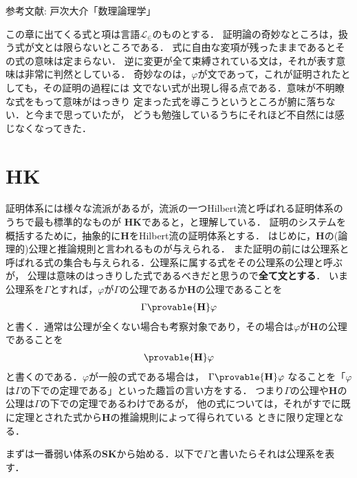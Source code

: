 	\begin{flushleft}
		参考文献: 戸次大介「数理論理学」
	\end{flushleft}
	
	この章に出てくる式と項は言語$\mathcal{L}_{\in}$のものとする．
	証明論の奇妙なところは，扱う式が文とは限らないところである．
	式に自由な変項が残ったままであるとその式の意味は定まらない．
	逆に変更が全て束縛されている文は，それが表す意味は非常に判然としている．
	奇妙なのは，$\varphi$が文であって，これが証明されたとしても，その証明の過程には
	文でない式が出現し得る点である．意味が不明瞭な式をもって意味がはっきり
	定まった式を導こうというところが腑に落ちない．と今まで思っていたが，
	どうも勉強しているうちにそれほど不自然には感じなくなってきた．
	

\section{{\bf HK}}
	証明体系には様々な流派があるが，流派の一つHilbert流と呼ばれる証明体系のうちで最も標準的なものが
	{\bf HK}であると，と理解している．
	証明のシステムを概括するために，抽象的に{\bf H}をHilbert流の証明体系とする．
	はじめに，{\bf H}の(論理的)公理と推論規則と言われるものが与えられる．
	また証明の前には公理系と呼ばれる式の集合も与えられる．公理系に属する式をその公理系の公理と呼ぶが，
	公理は意味のはっきりした式であるべきだと思うので{\bf 全て文とする}．
	いま公理系を$\Gamma$とすれば，$\varphi$が$\Gamma$の公理であるか{\bf H}の公理であることを
	\begin{align}
		\Gamma \provable{\mbox{{\bf H}}} \varphi
	\end{align}
	と書く．通常は公理が全くない場合も考察対象であり，その場合は$\varphi$が{\bf H}の公理であることを
	\begin{align}
		\provable{\mbox{{\bf H}}} \varphi
	\end{align}
	と書くのである．$\varphi$が一般の式である場合は，
	$\Gamma \provable{\mbox{{\bf H}}} \varphi$
	なることを「$\varphi$は$\Gamma$の下での定理である」といった趣旨の言い方をする．
	つまり$\Gamma$の公理や{\bf H}の公理は$\Gamma$の下での定理であるわけであるが，
	他の式については，それがすでに既に定理とされた式から{\bf H}の推論規則によって得られている
	ときに限り定理となる．
	
	まずは一番弱い体系の{\bf SK}から始める．以下で$\Gamma$と書いたらそれは公理系を表す．
	
